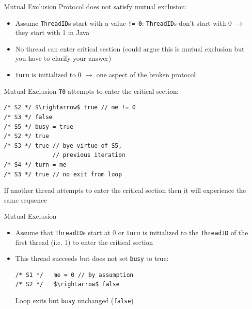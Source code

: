 \begin{frame}{Mutual Exclusion}
  Protocol does not satisfy mutual exclusion:


  \begin{itemize}
  \item Assume \lstinline!ThreadID!s start with a value
    \lstinline{!= 0}: \lstinline!ThreadID!s don't start with 0
    $\rightarrow$ they start with 1 in Java
  \item No thread can enter critical section (could argue this is
    mutual exclusion but you have to clarify your answer)
  \item \lstinline!turn! is initialized to 0 $\rightarrow$ one aspect
    of the broken protocol
  \end{itemize}
\end{frame}

\begin{frame}[fragile]{Mutual Exclusion}
  \lstinline!T0! attempts to enter the critical section:


\begin{lstlisting}
/* S2 */ $\rightarrow$ true // me != 0
/* S3 */ false
/* S5 */ busy = true
/* S2 */ true
/* S3 */ true // bye virtue of S5, 
              // previous iteration
/* S4 */ turn = me
/* S3 */ true // no exit from loop
\end{lstlisting}


  If another thread attempts to enter the critical section then it
  will experience the same sequence
\end{frame}

\begin{frame}[fragile]{Mutual Exclusion}
  \begin{itemize}
  \item Assume that \lstinline!ThreadID!s start at 0 or
    \lstinline!turn! is initialized to the \lstinline!ThreadID! of the
    first thread (i.e. 1) to enter the critical section
  \item This thread succeeds but does not set \lstinline!busy! to
    true:
\begin{lstlisting}
/* S1 */   me = 0 // by assumption
/* S2 */   $\rightarrow$ false
\end{lstlisting}
    Loop exits but \lstinline!busy! unchanged (\lstinline!false!)
  \end{itemize}
\end{frame}

